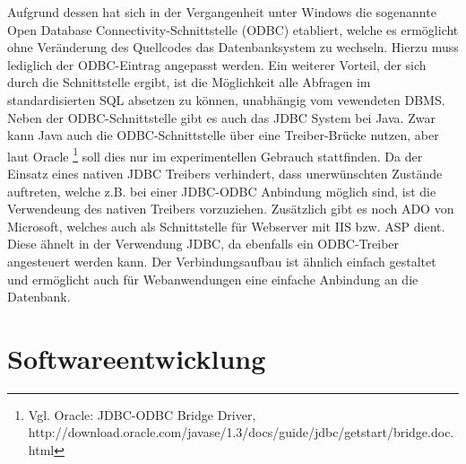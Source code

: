 Aufgrund dessen hat sich in der Vergangenheit unter Windows die sogenannte Open Database Connectivity-Schnittstelle (ODBC) etabliert, welche es ermöglicht ohne Veränderung des Quellcodes das Datenbanksystem zu wechseln.
Hierzu muss lediglich der ODBC-Eintrag angepasst werden.
Ein weiterer Vorteil, der sich durch die Schnittstelle ergibt, ist die Möglichkeit alle Abfragen im standardisierten SQL absetzen zu können, unabhängig vom vewendeten DBMS.
Neben der ODBC-Schnittstelle gibt es auch das JDBC System bei Java.
Zwar kann Java auch die ODBC-Schnittstelle über eine Treiber-Brücke nutzen, aber laut Oracle \footnote{Vgl. Oracle: JDBC-ODBC Bridge Driver, http://download.oracle.com/javase/1.3/docs/guide/jdbc/getstart/bridge.doc.html} soll dies nur im experimentellen Gebrauch stattfinden.
Da der Einsatz eines nativen JDBC Treibers verhindert, dass unerwünschten Zustände auftreten, welche z.B. bei einer JDBC-ODBC Anbindung möglich sind, ist die Verwendeung des nativen Treibers vorzuziehen.
Zusätzlich gibt es noch ADO von Microsoft, welches auch als Schnittstelle für Webserver mit IIS bzw. ASP dient.
Diese ähnelt in der Verwendung JDBC, da ebenfalls ein ODBC-Treiber angesteuert werden kann.
Der Verbindungsaufbau ist ähnlich einfach gestaltet und ermöglicht auch für Webanwendungen eine einfache Anbindung an die Datenbank.

\section{Softwareentwicklung}
\label{sec:softdev}

